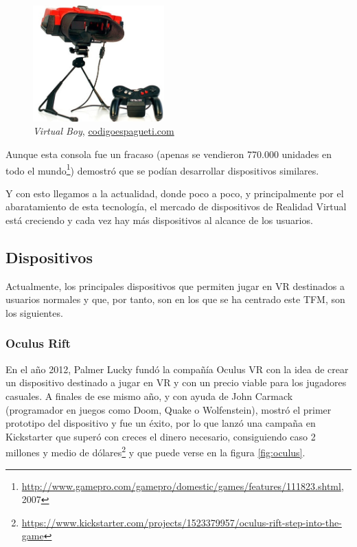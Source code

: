 \begin{figure}[H]
    \begin{center}
        \includegraphics[width=0.45\textwidth]{imagenes/2/virtual-boy.jpg}
        \caption{\textit{Virtual Boy}, \url{codigoespagueti.com}}
        \label{fig:virtual-boy}
    \end{center}
\end{figure}

Aunque esta consola fue un fracaso (apenas se vendieron 770.000 unidades en todo el mundo\footnote{\url{http://www.gamepro.com/gamepro/domestic/games/features/111823.shtml}, 2007}) demostró que se podían desarrollar dispositivos similares.

Y con esto llegamos a la actualidad, donde poco a poco, y principalmente por el abaratamiento de esta tecnología, el mercado de dispositivos de Realidad Virtual está creciendo y cada vez hay más dispositivos al alcance de los usuarios.

\subsection{Dispositivos}

Actualmente, los principales dispositivos que permiten jugar en \acs{VR} destinados a usuarios normales y que, por tanto, son en los que se ha centrado este \acs{TFM}, son los siguientes.

\subsubsection{Oculus Rift} 

En el año 2012, Palmer Lucky fundó la compañía Oculus VR con la idea de crear un dispositivo destinado a jugar en \acs{VR} y con un precio viable para los jugadores casuales. A finales de ese mismo año, y con ayuda de John Carmack (programador en juegos como Doom, Quake o Wolfenstein), mostró el primer prototipo del dispositivo y fue un éxito, por lo que lanzó una campaña en Kickstarter que superó con creces el dinero necesario, consiguiendo caso 2 millones y medio de dólares\footnote{\url{https://www.kickstarter.com/projects/1523379957/oculus-rift-step-into-the-game}} y que puede verse en la figura \ref{fig:oculus}.
    
